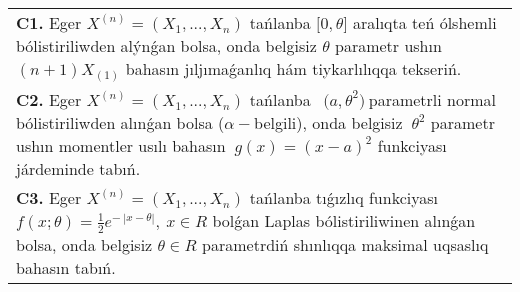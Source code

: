 \documentclass{article}
\begin{document}
\begin{tabular}{m{17cm}}
 \\
\textbf{C1.} 
Eger \(X^{(n)} = \left( X_{1},...,X_{n} \right)\) tańlanba \(\lbrack 0,\theta\rbrack\) aralıqta teń ólshemli bólistiriliwden alýnǵan bolsa, onda belgisiz \(\theta\) parametr ushın \((n + 1)X_{(1)}\) bahasın jıljımaǵanlıq hám tiykarlılıqqa tekseriń.
 \\
\textbf{C2.} 
Eger \(X^{(n)} = \left( X_{1},...,X_{n} \right)\) tańlanba \({\ \ (a,\theta}^{2})\ \)parametrli normal bólistiriliwden alınǵan bolsa (\(\alpha -\)belgili), onda belgisiz \({\ \theta}^{2}\) parametr ushın momentler usılı bahasın \({\ g(x) = (x - a)}^{2}\) funkciyası járdeminde tabıń.
 \\
\textbf{C3.} 
Eger \(X^{(n)} = \left( X_{1},...,X_{n} \right)\) tańlanba tıǵızlıq funkciyası
$f(x;\theta) = \frac{1}{2}e^{- \ |x - \theta|},\ x \in R$
bolǵan Laplas bólistiriliwinen alınǵan bolsa, onda belgisiz \(\theta \in R\) parametrdiń shınlıqqa maksimal uqsaslıq bahasın tabıń.
 \\

\end{tabular}
\vspace{1cm}
\end{document}
